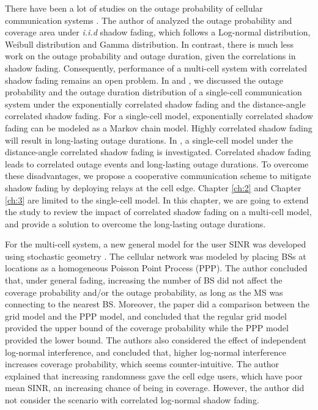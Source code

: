  \par There have been a lot of studies on the outage probability of cellular communication systems \cite{abu1991outage, petrovic2013outage, emamian2014outage}. The author of \cite{vural2015effect} analyzed the outage probability and coverage area under \emph{i.i.d} shadow fading, which follows a Log-normal distribution, Weibull distribution and Gamma distribution. In contrast, there is much less work on the outage probability and outage duration, given the correlations in shadow fading. Consequently, performance of a multi-cell system with correlated shadow fading remains an open problem. In \cite{lu2015long} and \cite{lu2015shining}, we discussed the outage probability and the outage duration distribution of a single-cell communication system under the exponentially correlated shadow fading and the distance-angle correlated shadow fading. For a single-cell model, exponentially correlated shadow fading can be modeled as a Markov chain model. Highly correlated shadow fading will result in long-lasting outage durations. In \cite{lu2015shining}, a single-cell model under the distance-angle correlated shadow fading is investigated. Correlated shadow fading leads to correlated outage events and long-lasting outage durations. To overcome these disadvantages, we propose a cooperative communication scheme to mitigate shadow fading by deploying relays at the cell edge. Chapter \ref{ch:2} and Chapter \ref{ch:3} are limited to the single-cell model. In this chapter, we are going to extend the study to review the impact of correlated shadow fading on a multi-cell model, and provide a solution to overcome the long-lasting outage durations.
 
 
 
 \par For the multi-cell system, a new general model for the user SINR was developed using stochastic geometry \cite{andrews2011tractable}. The cellular network was modeled by placing BSs at locations as a homogeneous Poisson Point Process (PPP). The author concluded that, under general fading, increasing the number of BS did not affect the coverage probability and/or the outage probability, as long as the MS was connecting to the nearest BS. Moreover, the paper did a comparison between the grid model and the PPP model, and concluded that the regular grid model provided the upper bound of the coverage probability while the PPP model provided the lower bound. The authors also considered the effect of independent log-normal interference, and concluded that, higher log-normal interference increases coverage probability, which seems counter-intuitive. The author explained that increasing randomness gave the cell edge users, which have poor mean SINR, an increasing chance of being in coverage. However, the author did not consider the scenario with correlated log-normal shadow fading. 
 
